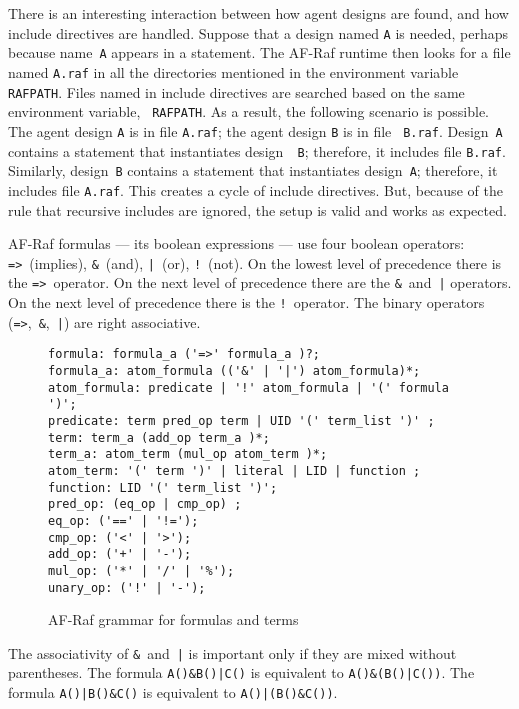 \documentclass[a4paper,12pt,oneside,fleqn]{book} %
\begin{document}
There is an interesting interaction between how agent designs are found,
and how include directives are handled. Suppose that a design named {\tt A}
is needed, perhaps because name~{\tt A} appears in a statement. The AF-Raf
runtime then looks for a file named {\tt A.raf} in all the directories
mentioned in the environment variable {\tt RAFPATH}. Files named in include
directives are searched based on the same environment variable, {\tt
RAFPATH}. As a result, the following scenario is possible. The agent design
{\tt A} is in file {\tt A.raf}; the agent design {\tt B} is in file {\tt
B.raf}. Design~{\tt A} contains a statement that instantiates design~{\tt
B}; therefore, it includes file {\tt B.raf}. Similarly, design~{\tt B}
contains a statement that instantiates design~{\tt A}; therefore, it
includes file {\tt A.raf}. This creates a cycle of include directives.
But, because of the rule that recursive includes are ignored, the setup is
valid and works as expected.

AF-Raf formulas --- its boolean expressions --- use four boolean operators:
\verb+=>+~(implies), \verb+&+~(and), \verb+|+~(or), \verb+!+~(not).  On the
lowest level of precedence there is the \verb+=>+~operator.  On the next
level of precedence there are the \verb+&+~and~\verb+|+ operators. On the
next level of precedence there is the \verb+!+~operator.  The binary
operators (\verb+=>+,~\verb+&+,~\verb+|+) are right associative.

\begin{figure}\footnotesize %
\begin{verbatim}
formula: formula_a ('=>' formula_a )?;
formula_a: atom_formula (('&' | '|') atom_formula)*;
atom_formula: predicate | '!' atom_formula | '(' formula ')';
predicate: term pred_op term | UID '(' term_list ')' ;
term: term_a (add_op term_a )*;
term_a: atom_term (mul_op atom_term )*;
atom_term: '(' term ')' | literal | LID | function ;
function: LID '(' term_list ')';
pred_op: (eq_op | cmp_op) ;
eq_op: ('==' | '!=');
cmp_op: ('<' | '>'); 
add_op: ('+' | '-');
mul_op: ('*' | '/' | '%');
unary_op: ('!' | '-'); 
\end{verbatim}
\caption{AF-Raf grammar for formulas and terms}
\label{fig:grammar-expr}
\end{figure} %

\begin{example}
The associativity of \verb+&+~and~\verb+|+ is important only if they are
mixed without parentheses.  The formula \verb+A()&B()|C()+ is equivalent to
\verb+A()&(B()|C())+.  The formula \verb+A()|B()&C()+ is equivalent to
\verb+A()|(B()&C())+.
\end{example}
\end{document}
